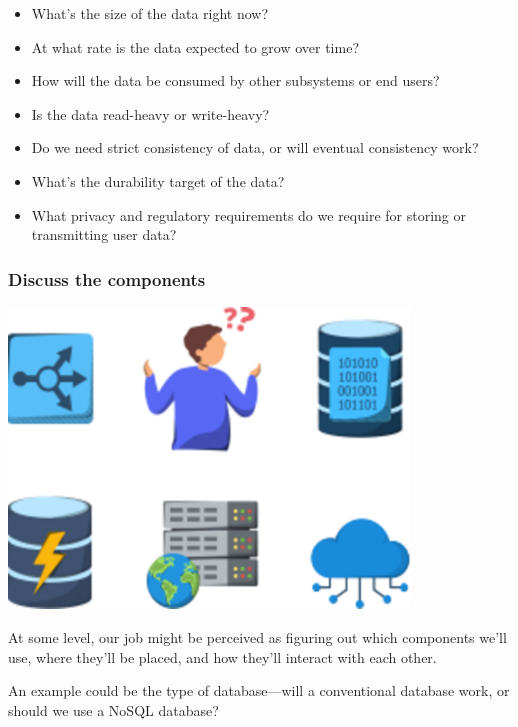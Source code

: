 \begin{itemize}
\tightlist
\item
What's the size of the data right now?
\item
At what rate is the data expected to grow over time?
\item
How will the data be consumed by other subsystems or end users?
\item
Is the data read-heavy or write-heavy?
\item
Do we need strict consistency of data, or will eventual consistency work?
\item
What's the durability target of the data?
\item
What privacy and regulatory requirements do we require for storing or transmitting user data?
\end{itemize}

\subsubsection{Discuss the components}\label{GssH7xRr0syIxOF6hF6eO}

\noindent
\begin{minipage}[t]{0.48\textwidth}
\includegraphics[width=0.8\textwidth]{Images/chapter_1/section_6043988183744512/4847058937053184.png}
\end{minipage}
\hfill
\begin{minipage}[t]{0.48\textwidth}
At some level, our job might be perceived as figuring out which components we'll use, where they'll be placed, and how they'll interact with each other.

An example could be the type of database---will a conventional database work, or should we use a NoSQL database?
\end{minipage}

